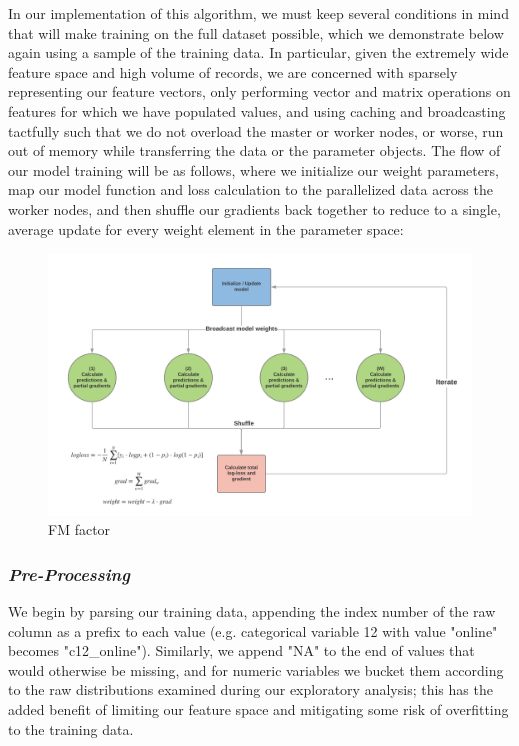 \documentclass[11pt]{article}
\makeatletter
\def\maxwidth{\ifdim\Gin@nat@width>\linewidth\linewidth
    \else\Gin@nat@width\fi}
\let\Oldincludegraphics\includegraphics
\renewcommand{\includegraphics}[1]{\Oldincludegraphics[width=.8\maxwidth]{#1}}
\makeatother
\begin{document}
In our implementation of this algorithm, we must keep several conditions
in mind that will make training on the full dataset possible, which we
demonstrate below again using a sample of the training data. In
particular, given the extremely wide feature space and high volume of
records, we are concerned with sparsely representing our feature
vectors, only performing vector and matrix operations on features for
which we have populated values, and using caching and broadcasting
tactfully such that we do not overload the master or worker nodes, or
worse, run out of memory while transferring the data or the parameter
objects. The flow of our model training will be as follows, where we
initialize our weight parameters, map our model function and loss
calculation to the parallelized data across the worker nodes, and then
shuffle our gradients back together to reduce to a single, average
update for every weight element in the parameter space:

\begin{figure}
\centering
\includegraphics{FINAL/images/Data_Flow_Diagram.png}
\caption{FM factor}
\end{figure}

    \subsubsection{\texorpdfstring{\emph{Pre-Processing}}{Pre-Processing}}\label{pre-processing}

We begin by parsing our training data, appending the index number of the
raw column as a prefix to each value (e.g. categorical variable 12 with
value "online" becomes "c12\_online"). Similarly, we append "NA" to the
end of values that would otherwise be missing, and for numeric variables
we bucket them according to the raw distributions examined during our
exploratory analysis; this has the added benefit of limiting our feature
space and mitigating some risk of overfitting to the training data.
\end{document}
